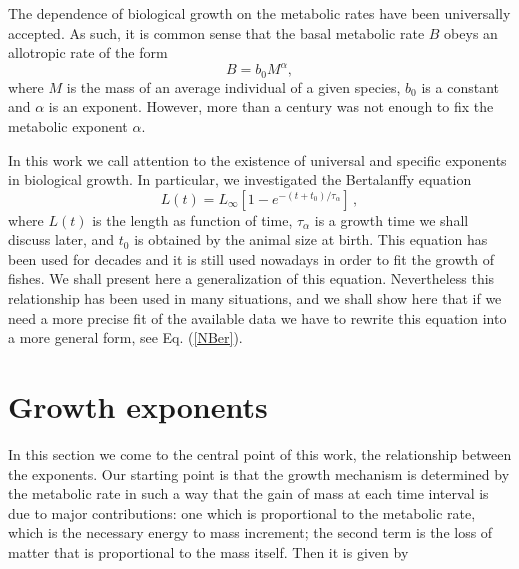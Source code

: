 \documentclass[10pt]{iopart}
\begin{document}
The dependence of biological growth on the metabolic rates have been universally accepted. As such, it is common sense that the basal metabolic rate $B$ obeys an allotropic rate of the form \cite{Bertalanffy38a,Bertalanffy57,West97,West99,Brown05,Hatton15,Cebrian16,Rubner1883,Kleiber32,Banavar10,Agutter11}
\begin{equation}
B = b_0M^{\alpha},
\end{equation}
where $M$ is the mass of an average individual of a given species, $b_0$ is a constant and $\alpha$ is an exponent. However, more than a century was not enough to fix the  metabolic exponent $\alpha$.

In this work we call attention to the existence of universal and specific exponents in biological growth. In particular, we investigated the Bertalanffy equation \cite{Bertalanffy38a,Bertalanffy57}
\begin{equation}
L(t) = L_\infty \left[ 1 - e^{-(t+t_0)/\tau_\alpha} \right]\,,
\label{Ber}
\end{equation}
where $L(t)$ is the length as function of time, $\tau_\alpha$ is a growth time we shall discuss later, and $t_0$ is obtained by the animal size at birth. This equation has been used for decades and it is still used nowadays  in order to fit
the growth of fishes. We shall present here a generalization of this equation. Nevertheless this relationship has been used in many situations, and we shall show here that if we need a more precise fit of the available data we have to rewrite this equation into a more general form, see
Eq. (\ref{NBer}).

\section{Growth exponents}
In this section we come to the central point of this work, the relationship between the exponents. Our starting point is that the growth mechanism is determined by the metabolic rate in such a way that the gain of mass at each time interval is due to major contributions: one which is proportional to the metabolic rate, which is the necessary energy to mass increment; the second term is the loss of matter that is proportional to the mass itself. Then it is given by
\end{document}
